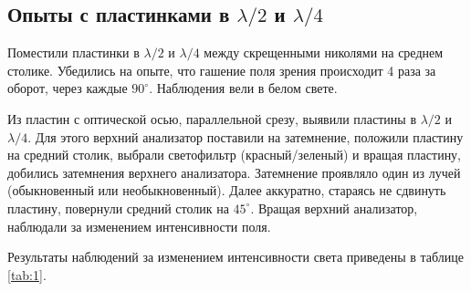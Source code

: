 \documentclass[12pt]{article}
\begin{document}
	\subsection{Опыты с пластинками в $\lambda/2$ и $\lambda/4$}
	Поместили пластинки в $\lambda/2$ и $\lambda/4$ между скрещенными николями на среднем столике. Убедились на опыте, что гашение поля зрения происходит 4 раза за оборот, через каждые $90^\circ$. Наблюдения вели в белом свете.
	\par Из пластин с оптической осью, параллельной срезу, выявили пластины в $\lambda/2$ и $\lambda/4$. Для этого верхний анализатор поставили на затемнение, положили пластину на средний столик, выбрали светофильтр (красный/зеленый) и вращая пластину, добились затемнения верхнего анализатора. Затемнение проявляло один из лучей (обыкновенный или необыкновенный).  Далее аккуратно, стараясь не сдвинуть пластину, повернули средний столик на $45^\circ$. Вращая верхний анализатор, наблюдали за изменением интенсивности поля.
	\par Результаты наблюдений за изменением интенсивности света приведены в таблице \ref{tab:1}.
\end{document}
